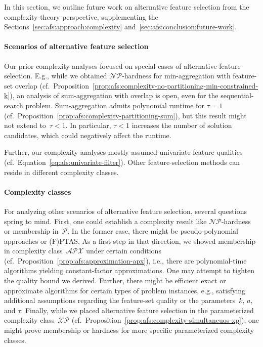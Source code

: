 \documentclass{article}
\theoremstyle{definition}
\begin{document}
In this section, we outline future work on alternative feature selection from the complexity-theory perspective, supplementing the Sections~\ref{sec:afs:approach:complexity} and~\ref{sec:afs:conclusion:future-work}.

\paragraph{Scenarios of alternative feature selection}

Our prior complexity analyses focused on special cases of alternative feature selection.
E.g., while we obtained $\mathcal{NP}$-hardness for min-aggregation with feature-set overlap (cf.~Proposition~\ref{prop:afs:complexity-no-partitioning-min-constrained-k}), an analysis of sum-aggregation with overlap is open, even for the sequential-search problem.
Sum-aggregation admits polynomial runtime for $\tau=1$ (cf.~Proposition~\ref{prop:afs:complexity-partitioning-sum}), but this result might not extend to~$\tau < 1$.
In particular, $\tau < 1$ increases the number of solution candidates, which could negatively affect the runtime.

Further, our complexity analyses mostly assumed univariate feature qualities (cf.~Equation~\ref{eq:afs:univariate-filter}).
Other feature-selection methods can reside in different complexity classes.

\paragraph{Complexity classes}

For analyzing other scenarios of alternative feature selection, several questions spring to mind.
First, one could establish a complexity result like $\mathcal{NP}$-hardness or membership in~$\mathcal{P}$.
In the former case, there might be pseudo-polynomial approaches or (F)PTAS.
As a first step in that direction, we showed membership in complexity class~$\mathcal{APX}$ under certain conditions (cf.~Proposition~\ref{prop:afs:approximation-apx}), i.e., there are polynomial-time algorithms yielding constant-factor approximations.
One may attempt to tighten the quality bound we derived.
Further, there might be efficient exact or approximate algorithms for certain types of problem instances, e.g., satisfying additional assumptions regarding the feature-set quality or the parameters~$k$, $a$, and $\tau$.
Finally, while we placed alternative feature selection in the parameterized complexity class~$\mathcal{XP}$ (cf.~Proposition~\ref{prop:afs:complexity-simultaneuos-xp}), one might prove membership or hardness for more specific parameterized complexity classes.
\end{document}
